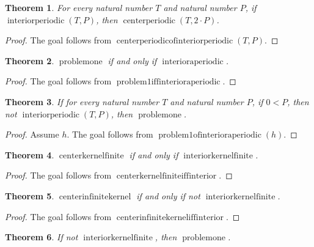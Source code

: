 \documentclass[11pt]{article}
\newtheorem{theorem}{Theorem}[section]
\theoremstyle{definition}
\begin{document}
\begin{theorem}
\label{ll:observations:center-periodic-of-interior-periodic}
For every natural number \(T\) and natural number \(P\), if \(\operatorname{interiorperiodic}(T, P)\), then \(\operatorname{centerperiodic}(T, 2 \cdot P)\).
\end{theorem}
\begin{proof}
The goal follows from \(\operatorname{centerperiodicofinteriorperiodic}(T, P)\).
\end{proof}
\begin{theorem}
\label{ll:observations:problem1-iff-interior-aperiodic}
\(\operatorname{problemone}\) if and only if \(\operatorname{interioraperiodic}\).
\end{theorem}
\begin{proof}
The goal follows from \(\operatorname{problem1iffinterioraperiodic}\).
\end{proof}
\begin{theorem}
\label{ll:observations:problem1-of-interior-aperiodic}
If for every natural number \(T\) and natural number \(P\), if \(0 < P\), then not \(\operatorname{interiorperiodic}(T, P)\), then \(\operatorname{problemone}\).
\end{theorem}
\begin{proof}
Assume \(h\).
The goal follows from \(\operatorname{problem1ofinterioraperiodic}(h)\).
\end{proof}
\begin{theorem}
\label{ll:observations:center-kernel-finite-iff-interior}
\(\operatorname{centerkernelfinite}\) if and only if \(\operatorname{interiorkernelfinite}\).
\end{theorem}
\begin{proof}
The goal follows from \(\operatorname{centerkernelfiniteiffinterior}\).
\end{proof}
\begin{theorem}
\label{ll:observations:center-infinite-kernel-iff-interior}
\(\operatorname{centerinfinitekernel}\) if and only if not \(\operatorname{interiorkernelfinite}\).
\end{theorem}
\begin{proof}
The goal follows from \(\operatorname{centerinfinitekerneliffinterior}\).
\end{proof}
\begin{theorem}
\label{ll:observations:problem1-of-interior-infinite-kernel}
If not \(\operatorname{interiorkernelfinite}\), then \(\operatorname{problemone}\).
\end{theorem}
\end{document}
